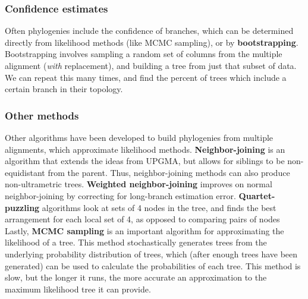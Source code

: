 \documentclass[12pt]{article}
\begin{document}
\subsubsection{Confidence estimates}
Often phylogenies include the confidence of branches, which can be determined directly from likelihood methods (like MCMC sampling), or by \textbf{bootstrapping}. Bootstrapping involves sampling a random set of columns from the multiple alignment (\textit{with} replacement), and building a tree from just that subset of data. We can repeat this many times, and find the percent of trees which include a certain branch in their topology. 

\subsubsection{Other methods}
Other algorithms have been developed to build phylogenies from multiple alignments, which approximate likelihood methods. \textbf{Neighbor-joining} is an algorithm that extends the ideas from UPGMA, but allows for siblings to be non-equidistant from the parent. Thus, neighbor-joining methods can also produce non-ultrametric trees. \textbf{Weighted neighbor-joining} improves on normal neighbor-joining by correcting for long-branch estimation error. \textbf{Quartet-puzzling} algorithms look at sets of 4 nodes in the tree, and finds the best arrangement for each local set of 4, as opposed to comparing pairs of nodes \\[10pt]
Lastly, \textbf{MCMC sampling} is an important algorithm for approximating the likelihood of a tree. This method stochastically generates trees from the underlying probability distribution of trees, which (after enough trees have been generated) can be used to calculate the probabilities of each tree. This method is slow, but the longer it runs, the more accurate an approximation to the maximum likelihood tree it can provide.
\end{document}
